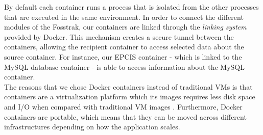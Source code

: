 By default each container runs a process that is isolated from the other processes that are executed
in the same environment. In order to connect the different modules of the Fosstrak, our containers are
linked through the \textit{linking system} provided by Docker. This mechanism creates a secure tunnel
between the containers, allowing the recipient container to access selected data about the source container.
For instance, our \gls{EPCIS} container - which is linked to the MySQL database container - is able to
access information about the MySQL container.\\

The reasons that we chose Docker containers instead of traditional \glspl{VM} is that containers are a
virtualization platform which its images requires less disk space and I/O when compared with traditional
\gls{VM} images \cite{merkel2014docker}. Furthermore, Docker containers are portable, which means that
they can be moved across different infrastructures depending on how the application scales.

